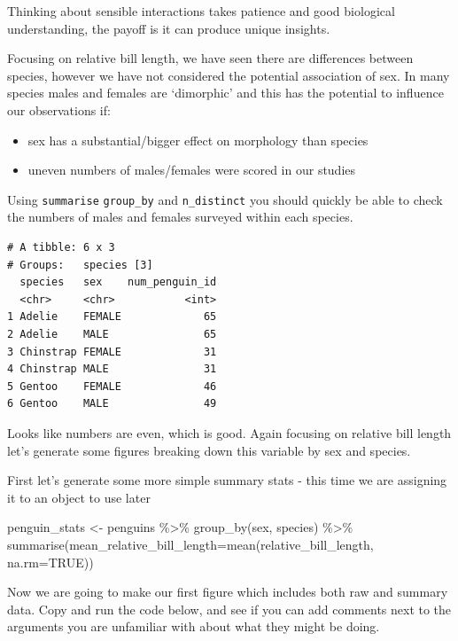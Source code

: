\documentclass[
]{book}
\newenvironment{Shaded}{\begin{snugshade}}{\end{snugshade}}
\newcommand{\AttributeTok}[1]{\textcolor[rgb]{0.77,0.63,0.00}{#1}}
\newcommand{\ConstantTok}[1]{\textcolor[rgb]{0.00,0.00,0.00}{#1}}
\newcommand{\FunctionTok}[1]{\textcolor[rgb]{0.00,0.00,0.00}{#1}}
\newcommand{\NormalTok}[1]{#1}
\newcommand{\OtherTok}[1]{\textcolor[rgb]{0.56,0.35,0.01}{#1}}
\newcommand{\SpecialCharTok}[1]{\textcolor[rgb]{0.00,0.00,0.00}{#1}}
\begin{document}
Thinking about sensible interactions takes patience and good biological understanding, the payoff is it can produce unique insights.

Focusing on relative bill length, we have seen there are differences between species, however we have not considered the potential association of sex. In many species males and females are `dimorphic' and this has the potential to influence our observations if:

\begin{itemize}
\item
  sex has a substantial/bigger effect on morphology than species
\item
  uneven numbers of males/females were scored in our studies
\end{itemize}

Using \texttt{summarise} \texttt{group\_by} and \texttt{n\_distinct} you should quickly be able to check the numbers of males and females surveyed within each species.

\begin{verbatim}
# A tibble: 6 x 3
# Groups:   species [3]
  species   sex    num_penguin_id
  <chr>     <chr>           <int>
1 Adelie    FEMALE             65
2 Adelie    MALE               65
3 Chinstrap FEMALE             31
4 Chinstrap MALE               31
5 Gentoo    FEMALE             46
6 Gentoo    MALE               49
\end{verbatim}

Looks like numbers are even, which is good. Again focusing on relative bill length let's generate some figures breaking down this variable by sex and species.

First let's generate some more simple summary stats - this time we are assigning it to an object to use later

\begin{Shaded}
\begin{Highlighting}[]
\NormalTok{penguin\_stats }\OtherTok{\textless{}{-}}\NormalTok{ penguins }\SpecialCharTok{\%\textgreater{}\%} 
  \FunctionTok{group\_by}\NormalTok{(sex, species) }\SpecialCharTok{\%\textgreater{}\%} 
  \FunctionTok{summarise}\NormalTok{(}\AttributeTok{mean\_relative\_bill\_length=}\FunctionTok{mean}\NormalTok{(relative\_bill\_length, }\AttributeTok{na.rm=}\ConstantTok{TRUE}\NormalTok{))}
\end{Highlighting}
\end{Shaded}

Now we are going to make our first figure which includes both raw and summary data. Copy and run the code below, and see if you can add comments next to the arguments you are unfamiliar with about what they might be doing.
\end{document}
